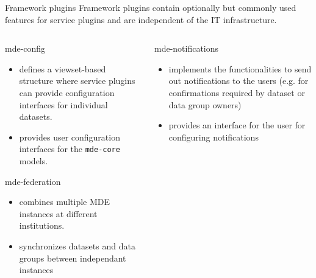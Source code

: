 \begin{frame}{Framework plugins} \label{frm:framework-plugins}
    Framework plugins contain optionally but commonly used features for service
    plugins and are independent of the IT infrastructure.

    \begin{columns}[T]
        \begin{column}{0.45\textwidth}
            \begin{block}{mde-config}
                \begin{itemize}
                    \item defines a viewset-based structure where service
                        plugins can provide configuration interfaces for
                        individual datasets.
                    \item provides user configuration interfaces for the
                        \lstinline|mde-core| models.
                \end{itemize}
            \end{block}
            \begin{block}{mde-federation}
                \begin{itemize}
                    \item combines multiple MDE instances at different
                        institutions.
                    \item synchronizes datasets and data groups between
                        independant instances
                \end{itemize}
                \hyperlink{frm:federation}{}

            \end{block}
        \end{column}
        \begin{column}{0.45\textwidth}
            \begin{block}{mde-notifications}
                \begin{itemize}
                    \item implements the functionalities to send out
                        notifications to the users (e.g. for confirmations
                        required by dataset or data group owners)
                    \item provides an interface for the user for configuring
                        notifications
                \end{itemize}
            \end{block}


\end{column}
\end{columns}
\end{frame}
